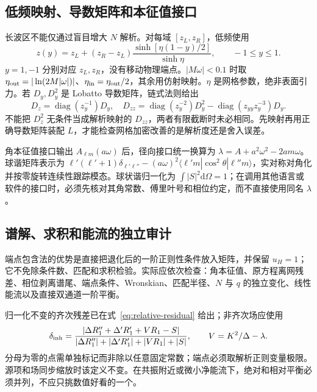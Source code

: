 \documentclass[UTF8,fontset=fandol,12pt,a4paper,oneside,openany]{ctexrep}
\newcommand{\dd}{\mathrm d}
\begin{document}
\subsection{低频映射、导数矩阵和本征值接口}
长波区不能仅通过盲目增大 $N$ 解析。对每域 $[z_L,\allowbreak z_R]$，低频使用
\begin{equation}
 z(y)=z_L+(z_R-z_L)\frac{\sinh[\eta(1-y)/2]}{\sinh\eta},\qquad -1\le y\le1.
\end{equation}
$y=1,\allowbreak -1$ 分别对应 $z_L,\allowbreak z_R$，没有移动物理端点。$|M\omega|<0.1$ 时取 $\eta_{\rm out}=|\ln(2M|\omega|)|$、$\eta_{\rm in}=\eta_{\rm out}/2$，其余用仿射映射。$\eta$ 是网格参数，绝非表面引力。若 $D_y,\allowbreak D_y^2$ 是 Lobatto 导数矩阵，链式法则给出
\begin{equation}
 D_z=\operatorname{diag}(z_y^{-1})D_y,\quad
 D_{zz}=\operatorname{diag}(z_y^{-2})D_y^2
 -\operatorname{diag}(z_{yy}z_y^{-3})D_y.
\end{equation}
不能把 $D_z^2$ 无条件当成解析映射的 $D_{zz}$，两者有限截断时未必相同。先映射再用正确导数矩阵装配 $L$，才能检查网格加密改善的是解析度还是舍入误差。

角本征值接口输出 $A_{\ell m}(a\omega)$ 后，径向接口统一换算为 $\lambda=A+a^2\omega^2-2am\omega$。球谐矩阵表示为 $\ell'(\ell'+1)\delta_{\ell'\ell''}-(a\omega)^2\langle\ell'm|\cos^2\theta|\ell''m\rangle$，实对称对角化并按零旋转连续性跟踪模态。球状谐归一化为 $\int|S|^2\dd\Omega=1$；在调用其他语言或软件的接口时，必须先核对其角常数、傅里叶号和相位约定，而不直接使用同名 $\lambda$。

\subsection{谱解、求积和能流的独立审计}
端点包含法的优势是直接把退化后的一阶正则性条件放入矩阵，并保留 $u_H=1$；它不免除条件数、匹配和求积检验。实际应依次检查：角本征值、原方程离网残差、相位剥离谱尾、端点条件、Wronskian、匹配半径、$N$ 与 $q$ 的独立变化、线性能流以及直接双通道一阶平衡。

归一化不变的齐次残差已在式~\eqref{eq:relative-residual} 给出；非齐次场应使用
\begin{equation}
 \delta_{\rm inh}=
 \frac{|\Delta R_1''+\Delta'R_1'+VR_1-S|}
 {|\Delta R_1''|+|\Delta'R_1'|+|VR_1|+|S|},\qquad
 V=K^2/\Delta-\lambda.
\end{equation}
分母为零的点需单独标记而非除以任意固定常数；端点必须取解析正则变量极限。源项和场同步缩放时该定义不变。在共振附近或微小净能流下，绝对和相对平衡必须并列，不应只挑数值好看的一个。
\end{document}
